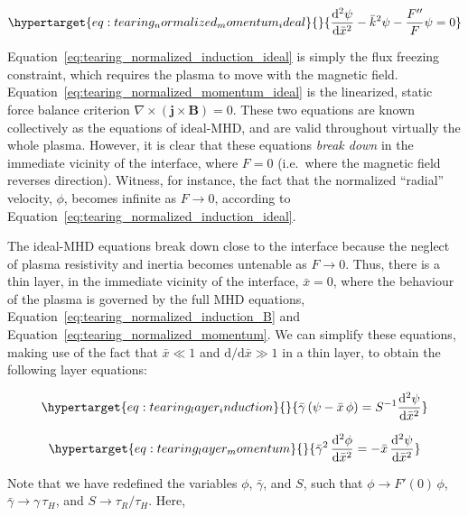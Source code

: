 \documentclass[
  notoc %
]{tufte-book}
\begin{document}
\begin{equation}\protect\hypertarget{eq:tearing_normalized_momentum_ideal}{}{
\frac{\mathrm{d}^2\psi}{\mathrm{d}\bar{x}^2} - \bar{k}^2\psi - \frac{F''}{F}\psi = 0
}\label{eq:tearing_normalized_momentum_ideal}\end{equation}

Equation~\ref{eq:tearing_normalized_induction_ideal} is simply the flux
freezing constraint, which requires the plasma to move with the magnetic
field. Equation~\ref{eq:tearing_normalized_momentum_ideal} is the
linearized, static force balance criterion
\(\nabla\times(\mathbf{j}\times\mathbf{B})=0\). These two equations are
known collectively as the equations of ideal-MHD, and are valid
throughout virtually the whole plasma. However, it is clear that these
equations \emph{break down} in the immediate vicinity of the interface,
where \(F=0\) (i.e.~where the magnetic field reverses direction).
Witness, for instance, the fact that the normalized ``radial'' velocity,
\(\phi\), becomes infinite as \(F\rightarrow 0\), according to
Equation~\ref{eq:tearing_normalized_induction_ideal}.

The ideal-MHD equations break down close to the interface because the
neglect of plasma resistivity and inertia becomes untenable as
\(F\rightarrow 0\). Thus, there is a thin layer, in the immediate
vicinity of the interface, \(\bar{x}=0\), where the behaviour of the
plasma is governed by the full MHD equations,
Equation~\ref{eq:tearing_normalized_induction_B} and
Equation~\ref{eq:tearing_normalized_momentum}. We can simplify these
equations, making use of the fact that \(\bar{x}\ll 1\) and
\(\mathrm{d}/\mathrm{d}\bar{x} \gg 1\) in a thin layer, to obtain the
following layer equations:

\begin{equation}\protect\hypertarget{eq:tearing_layer_induction}{}{
\bar{\gamma}\,(\psi - \bar{x}\,\phi) = S^{-1}\frac{\mathrm{d}^2\psi}{\mathrm{d}\bar{x}^2}
}\label{eq:tearing_layer_induction}\end{equation}

\begin{equation}\protect\hypertarget{eq:tearing_layer_momentum}{}{
\bar{\gamma}^2\,\frac{\mathrm{d}^2\phi}{\mathrm{d}\bar{x}^2} = - \bar{x}\,\frac{\mathrm{d}^2\psi}{\mathrm{d}\bar{x}^2}
}\label{eq:tearing_layer_momentum}\end{equation}

Note that we have redefined the variables \(\phi\), \(\bar{\gamma}\),
and \(S\), such that \(\phi\rightarrow F'(0)\,\phi\),
\(\bar{\gamma}\rightarrow \gamma\,\tau_H\), and
\(S\rightarrow \tau_R/\tau_H\). Here,
\end{document}
